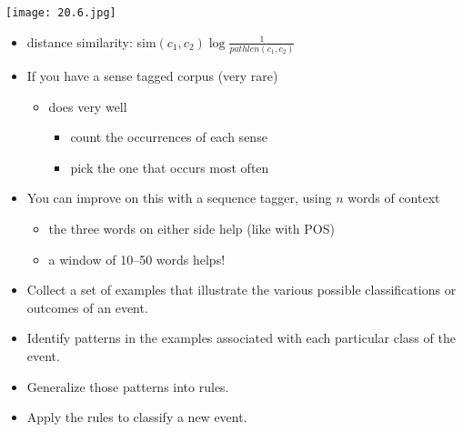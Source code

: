 \documentclass[a4paper,landscape,headrule,footrule,xetex]{foils}
\begin{document}

\begin{center}
 \noindent\texttt{[image: 20.6.jpg]}  %
\end{center}
\begin{itemize}
\item distance \into similarity:   sim$(c_1, c_2)\log\frac{1}{pathlen(c_1, c_2)}$
\end{itemize}


\begin{itemize}
\item If you have a sense tagged corpus (very rare)
  \begin{itemize}
  \item {} does very well
    \begin{itemize}
    \item count the occurrences of each sense
    \item pick the one that occurs most often
    \end{itemize}
  \end{itemize}
\item You can improve on this with a sequence tagger, using $n$ words of context
  \begin{itemize}
  \item the three words on either side help (like with POS)
  \item a window of 10--50 words helps! 
  \end{itemize}
\end{itemize}


\begin{itemize}
\item Collect a set of examples that illustrate the various possible classifications or outcomes of an event.
\item 
Identify patterns in the examples associated with each particular class of the event.
\item 
Generalize those patterns into rules.
\item 
Apply the rules to classify a new event.
\end{itemize}

\end{document}
